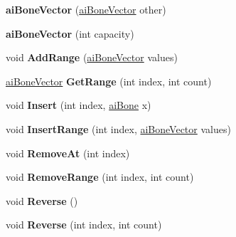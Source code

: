\begin{DoxyCompactItemize}
\item 
\hypertarget{classai_bone_vector_a684a4c5a76f30309defc5ca152f24d22}{{\bfseries ai\+Bone\+Vector} (\hyperlink{classai_bone_vector}{ai\+Bone\+Vector} other)}\label{classai_bone_vector_a684a4c5a76f30309defc5ca152f24d22}

\item 
\hypertarget{classai_bone_vector_ad5237978522340b33907a7040c52e40f}{{\bfseries ai\+Bone\+Vector} (int capacity)}\label{classai_bone_vector_ad5237978522340b33907a7040c52e40f}

\item 
\hypertarget{classai_bone_vector_a03d594ba949aca2d7412190627d6e50d}{void {\bfseries Add\+Range} (\hyperlink{classai_bone_vector}{ai\+Bone\+Vector} values)}\label{classai_bone_vector_a03d594ba949aca2d7412190627d6e50d}

\item 
\hypertarget{classai_bone_vector_ab96df218c1e28fd402830e9a2e8c2353}{\hyperlink{classai_bone_vector}{ai\+Bone\+Vector} {\bfseries Get\+Range} (int index, int count)}\label{classai_bone_vector_ab96df218c1e28fd402830e9a2e8c2353}

\item 
\hypertarget{classai_bone_vector_afb9d90f1f297343f0c5b5605399b8084}{void {\bfseries Insert} (int index, \hyperlink{structai_bone}{ai\+Bone} x)}\label{classai_bone_vector_afb9d90f1f297343f0c5b5605399b8084}

\item 
\hypertarget{classai_bone_vector_a17ae8bff206531dc215971eec8c29ac3}{void {\bfseries Insert\+Range} (int index, \hyperlink{classai_bone_vector}{ai\+Bone\+Vector} values)}\label{classai_bone_vector_a17ae8bff206531dc215971eec8c29ac3}

\item 
\hypertarget{classai_bone_vector_a3a3d615e14deef4fc2f3bbcabf17c199}{void {\bfseries Remove\+At} (int index)}\label{classai_bone_vector_a3a3d615e14deef4fc2f3bbcabf17c199}

\item 
\hypertarget{classai_bone_vector_acb49e2a5875d892ac8a2cbd0989f9c5c}{void {\bfseries Remove\+Range} (int index, int count)}\label{classai_bone_vector_acb49e2a5875d892ac8a2cbd0989f9c5c}

\item 
\hypertarget{classai_bone_vector_ad23010e14f7006e2873dc4524154ddf1}{void {\bfseries Reverse} ()}\label{classai_bone_vector_ad23010e14f7006e2873dc4524154ddf1}

\item 
\hypertarget{classai_bone_vector_af6b476d52a12ad0ec7ef08c21b820f96}{void {\bfseries Reverse} (int index, int count)}\label{classai_bone_vector_af6b476d52a12ad0ec7ef08c21b820f96}


\end{DoxyCompactItemize}
